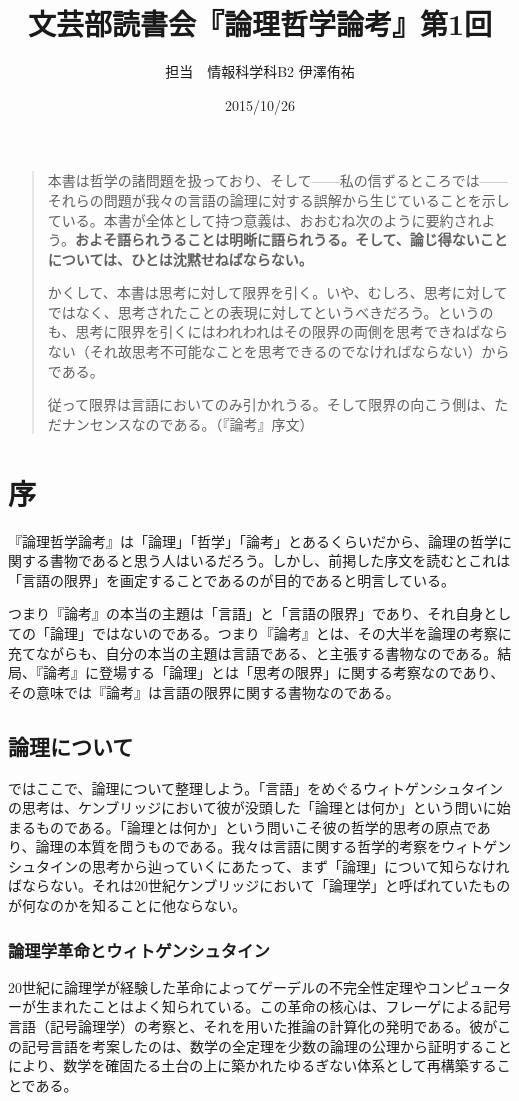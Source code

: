 \documentclass[a4paper,11pt]{jsarticle}
\title{文芸部読書会『論理哲学論考』第1回}
\author{担当　情報科学科B2 伊澤侑祐}
\date{2015/10/26}
\begin{document}
\maketitle

\begin{quote}
本書は哲学の諸問題を扱っており、そして------私の信ずるところでは------それらの問題が我々の言語の論理に対する誤解から生じていることを示している。本書が全体として持つ意義は、おおむね次のように要約されよう。{\bf{およそ語られうることは明晰に語られうる。そして、論じ得ないことについては、ひとは沈黙せねばならない。}}

かくして、本書は思考に対して限界を引く。いや、むしろ、思考に対してではなく、思考されたことの表現に対してというべきだろう。というのも、思考に限界を引くにはわれわれはその限界の両側を思考できねばならない（それ故思考不可能なことを思考できるのでなければならない）からである。

従って限界は言語においてのみ引かれうる。そして限界の向こう側は、ただナンセンスなのである。（『論考』序文）
\end{quote}
\section{序}
『論理哲学論考』は「論理」「哲学」「論考」とあるくらいだから、論理の哲学に関する書物であると思う人はいるだろう。しかし、前掲した序文を読むとこれは「言語の限界」を画定することであるのが目的であると明言している。

つまり『論考』の本当の主題は「言語」と「言語の限界」であり、それ自身としての「論理」ではないのである。つまり『論考』とは、その大半を論理の考察に充てながらも、自分の本当の主題は言語である、と主張する書物なのである。結局、『論考』に登場する「論理」とは「思考の限界」に関する考察なのであり、その意味では『論考』は言語の限界に関する書物なのである。

\subsection{論理について}
ではここで、論理について整理しよう。「言語」をめぐるウィトゲンシュタインの思考は、ケンブリッジにおいて彼が没頭した「論理とは何か」という問いに始まるものである。「論理とは何か」という問いこそ彼の哲学的思考の原点であり、論理の本質を問うものである。我々は言語に関する哲学的考察をウィトゲンシュタインの思考から辿っていくにあたって、まず「論理」について知らなければならない。それは20世紀ケンブリッジにおいて「論理学」と呼ばれていたものが何なのかを知ることに他ならない。

\subsubsection{論理学革命とウィトゲンシュタイン}
20世紀に論理学が経験した革命によってゲーデルの不完全性定理やコンピューターが生まれたことはよく知られている。この革命の核心は、フレーゲによる記号言語（記号論理学）の考察と、それを用いた推論の計算化の発明である。彼がこの記号言語を考案したのは、数学の全定理を少数の論理の公理から証明することにより、数学を確固たる土台の上に築かれたゆるぎない体系として再構築することである。
\end{document}
